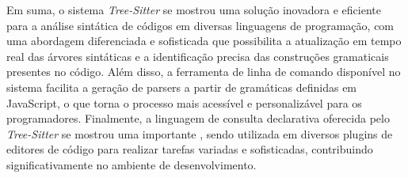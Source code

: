 \documentclass
  [11pt, a4paper, english, openright, sumario = tradicional, twoside, brazil]
  {abntex2}
\begin{document}
  Em suma, o sistema \textit{Tree-Sitter} se mostrou uma solução inovadora e
  eficiente para a análise sintática de códigos em diversas linguagens de
  programação, com uma abordagem diferenciada e sofisticada que possibilita a
  atualização em tempo real das árvores sintáticas e a identificação precisa
  das construções gramaticais presentes no código. Além disso, a ferramenta de
  linha de comando disponível no sistema facilita a geração de parsers a partir
  de gramáticas definidas em JavaScript, o que torna o processo mais acessível
  e personalizável para os programadores. Finalmente, a linguagem de consulta
  declarativa oferecida pelo \textit{Tree-Sitter} se mostrou uma importante
  \textit{}, sendo utilizada em diversos plugins de editores de
  código para realizar tarefas variadas e sofisticadas, contribuindo
  significativamente no ambiente de desenvolvimento.


  \postextual
  \printbibliography
\end{document}
